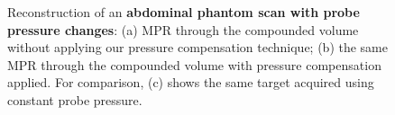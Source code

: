 \begin{figure}[ht]
	\centering
	\caption{Reconstruction of an \textbf{abdominal phantom scan with probe pressure changes}: (a) MPR through the compounded volume without applying our pressure compensation technique; (b) the same MPR through the compounded volume with pressure compensation applied. For comparison, (c) shows the same target acquired using constant probe pressure.}
	\label{fig:uscompounding:comparison-pressure}
\end{figure}

